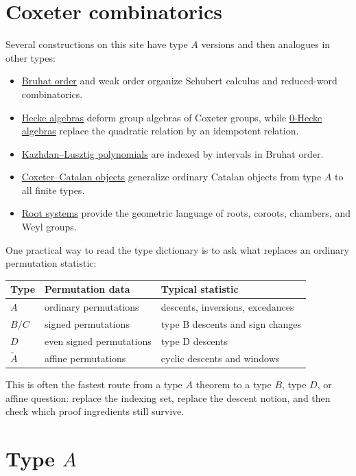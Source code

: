 \section[coxeterCombinatorics]{Coxeter combinatorics}

Several constructions on this site have type \(A\) versions and then analogues
in other types:
\begin{itemize}
\item \hyperref[bruhatOrder]{Bruhat order} and weak order organize Schubert
calculus and reduced-word combinatorics.
\item \hyperref[heckeAlgebra]{Hecke algebras} deform group algebras of
Coxeter groups, while \hyperref[zeroHeckeAlgebra]{0-Hecke algebras} replace
the quadratic relation by an idempotent relation.
\item \hyperref[kazhdanLusztigPolynomials]{Kazhdan--Lusztig polynomials} are
indexed by intervals in Bruhat order.
\item \hyperref[cspWCatalan]{Coxeter--Catalan objects} generalize ordinary
Catalan objects from type \(A\) to all finite types.
\item \hyperref[rootSystem]{Root systems} provide the geometric language of
roots, coroots, chambers, and Weyl groups.
\end{itemize}

One practical way to read the type dictionary is to ask what replaces an
ordinary permutation statistic:
\begin{tabular}{lll}
\toprule
Type & Permutation data & Typical statistic\\
\midrule
$A$ & ordinary permutations & descents, inversions, excedances\\
$B/C$ & signed permutations & type B descents and sign changes\\
$D$ & even signed permutations & type D descents\\
$\widetilde A$ & affine permutations & cyclic descents and windows\\
\bottomrule
\end{tabular}
This is often the fastest route from a type \(A\) theorem to a type \(B\),
type \(D\), or affine question: replace the indexing set, replace the descent
notion, and then check which proof ingredients still survive.

\section[coxeterTypeA]{Type \(A\)}

